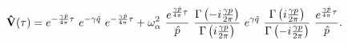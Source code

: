 \begin{equation}\label{V(bb)}
{\bf \hat V}(\tau)
=e^{-\frac{\gamma\hat p}{4\pi}\tau}\,\,
e^{-\gamma \hat q}\,\,e^{-\frac{\gamma\hat p}{4\pi}\tau}+
\omega_\alpha^2\,\,\frac{e^{\frac{\gamma\hat p}{4\pi}\tau}}{\hat p}\,\,   
\frac{\Gamma\left(-i\frac{\gamma p}{2\pi}\right)}
{\Gamma\left(i\frac{\gamma p}{2\pi}\right)}\,\,
e^{\gamma \hat q}\,\,
\frac{\Gamma\left(i\frac{\gamma p}{2\pi}\right)}
{\Gamma\left(-i\frac{\gamma p}{2\pi}\right)}
\,\,\frac{e^{\frac{\gamma\hat p}{4\pi}\tau}}{\hat p}.
\end{equation}


